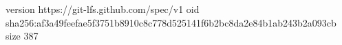 version https://git-lfs.github.com/spec/v1
oid sha256:af3a49feefae5f3751b8910c8c778d525141f6b2bc8da2e84b1ab243b2a093cb
size 387
